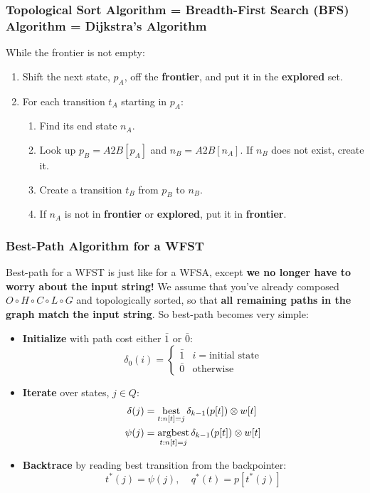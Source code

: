 \documentclass{beamer}
\newcommand{\best}{\operatornamewithlimits{best}}
\newcommand{\argbest}{\operatornamewithlimits{argbest}}
\begin{document}
\begin{frame}
  \frametitle{Topological Sort Algorithm = Breadth-First Search (BFS) Algorithm = Dijkstra's Algorithm}
  
  While the frontier is not empty:
  \begin{enumerate}
  \item Shift the next state, $p_A$, off the {\bf frontier}, and put
    it in the {\bf explored} set.
  \item For each transition $t_A$ starting in $p_A$:
    \begin{enumerate}
    \item Find its end state $n_A$.
    \item Look up $p_B=A2B[p_A]$ and $n_B=A2B[n_A]$.  If $n_B$ does
      not exist, create it.
    \item Create a transition $t_B$ from $p_B$ to $n_B$.
    \item If $n_A$ is not in {\bf frontier} or {\bf explored}, put it
      in {\bf frontier}.
    \end{enumerate}
  \end{enumerate}
\end{frame}      

\begin{frame}
  \frametitle{Best-Path Algorithm for a WFST}

  Best-path for a WFST is just like for a WFSA, except {\bf we no
    longer have to worry about the input string!}  We assume that
  you've already composed $O\circ H\circ C\circ L\circ G$ and
  topologically sorted, so that {\bf all remaining paths in the graph
    match the input string}.  So best-path becomes very simple:
  \begin{itemize}
  \item {\bf Initialize} with path cost either $\bar{1}$ or $\bar{0}$:
    \begin{displaymath}
      \delta_0(i) = \begin{cases}
        \bar{1} & i=\mbox{initial state}\\
        \bar{0} & \mbox{otherwise}
      \end{cases}
    \end{displaymath}
  \item {\bf Iterate} over states, $j\in Q$:
    \begin{align*}
      \delta(j) &= \best_{t:n[t]=j} \delta_{k-1}(p[t]) \otimes w[t]\\
      \psi(j) &= \argbest_{t:n[t]=j} \delta_{k-1}(p[t]) \otimes w[t]
    \end{align*}
  \item {\bf Backtrace} by reading best transition from the backpointer:
    \begin{displaymath}
      t^*(j) = \psi(j),~~~~~q^*(t)=p[t^*(j)]
    \end{displaymath}
  \end{itemize}
\end{frame}
\end{document}
